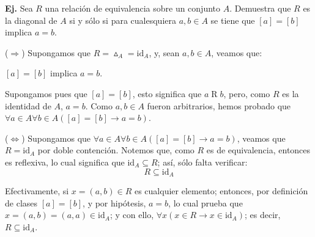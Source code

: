 \documentclass[letterpaper,DIV=14,headsepline,12pt]{scrartcl}
\makeatletter
\newcounter{Ejer}
\newcommand{\pts}{}
\newenvironment{ejercicio}[1]{\noindent
    \ifthenelse{\equal{#1}{1} \OR \equal{#1}{+1}}{\renewcommand{\pts}{\textbf{(#1 pt)}}}{\renewcommand{\pts}{\textbf{(#1 pts)}}}\textbf{Ej. \theEjer} \pts\stepcounter{Ejer}}{\vspace{.3cm}}
\renewenvironment{proof}[1][]{%
        \par\pushQED{\qed}%
        \normalfont\topsep6pt \partopsep0pt %
        \trivlist
        \item[\hskip\labelsep
                \textbf{\textit{Demostración.}}%
        ]#1
        }{%
        \popQED\endtrivlist\@endpefalse
    }
\newcommand{\id}{\mathrm{id}}
\makeatother
\begin{document}
    \begin{ejercicio}{1}\label{ej-6}
        Sea $R$ una relación de equivalencia sobre un conjunto $A$. Demuestra que $R$ es la diagonal de $A$ si y sólo si para cualesquiera $a,b \in A$ se tiene que $[a]=[b]$ implica $a=b$.
    \end{ejercicio}
    \begin{proof}
        ($\Rightarrow$) Supongamos que $R=\vartriangle_A=\id_A$, y, sean $a,b \in A$, veamos que:
        \begin{center}
            $[a]=[b]$ implica $a=b$.
        \end{center}

        Supongamos pues que $[a]=[b]$, esto significa que $a \mathrel{R} b$, pero, como $R$ es la identidad de $A$, $a=b$. Como $a,b \in A$ fueron arbitrarios, hemos probado que $\forall a \in A \forall b \in A ([a]=[b] \to a=b)$.

        ($\Leftrightarrow$) Supongamos que $\forall a \in A \forall b \in A ([a]=[b] \to a=b)$, veamos que $R=\id_A$ por doble contención. Notemos que, como $R$ es de equivalencia, entonces es reflexiva, lo cual significa que $\id_A \subseteq R$; así, sólo falta verificar:
        \[ R \subseteq \id_A \]

        Efectivamente, si $x=(a,b) \in R$ es cualquier elemento; entonces, por definición de clases $[a]=[b]$, y por hipótesis, $a=b$, lo cual prueba que $x=(a,b)=(a,a) \in \id_A$; y con ello, $\forall x ( x\in R \to x \in \id_A)$; es decir, $R \subseteq \id_A$.
    \end{proof}
\end{document}
